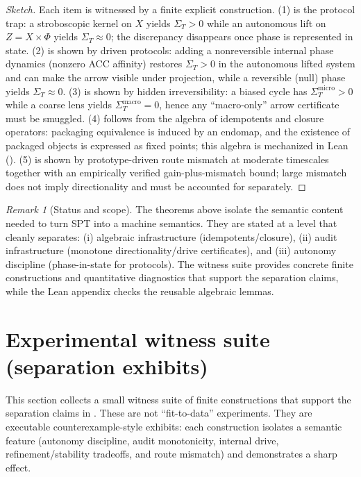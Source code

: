 \documentclass[11pt]{article}
\theoremstyle{definition}
\theoremstyle{remark}
\newtheorem{remark}[theorem]{Remark}
\begin{document}
\begin{proof}[Sketch]
Each item is witnessed by a finite explicit construction.
(1) is the protocol trap: a stroboscopic kernel on $X$ yields $\Sigma_T>0$ while an autonomous lift on $Z=X\times\Phi$ yields $\Sigma_T\approx 0$; the discrepancy disappears once phase is represented in state.
(2) is shown by driven protocols: adding a nonreversible internal phase dynamics (nonzero ACC affinity) restores $\Sigma_T>0$ in the autonomous lifted system and can make the arrow visible under projection, while a reversible (null) phase yields $\Sigma_T\approx 0$.
(3) is shown by hidden irreversibility: a biased cycle has $\Sigma_T^{\mathrm{micro}}>0$ while a coarse lens yields $\Sigma_T^{\mathrm{macro}}=0$, hence any ``macro-only'' arrow certificate must be smuggled.
(4) follows from the algebra of idempotents and closure operators: packaging equivalence is induced by an endomap, and the existence of packaged objects is expressed as fixed points; this algebra is mechanized in Lean ().
(5) is shown by prototype-driven route mismatch at moderate timescales together with an empirically verified gain-plus-mismatch bound; large mismatch does not imply directionality and must be accounted for separately.
\end{proof}

\begin{remark}[Status and scope]
The theorems above isolate the semantic content needed to turn SPT into a machine semantics.
They are stated at a level that cleanly separates: (i) algebraic infrastructure (idempotents/closure), (ii) audit infrastructure (monotone directionality/drive certificates), and (iii) autonomy discipline (phase-in-state for protocols).
The witness suite provides concrete finite constructions and quantitative diagnostics that support the separation claims, while the Lean appendix checks the reusable algebraic lemmas.
\end{remark}
 \section{Experimental witness suite (separation exhibits)}
\label{sec:experiments}

This section collects a small witness suite of finite constructions that support the separation claims in .
These are not ``fit-to-data'' experiments.
They are executable counterexample-style exhibits: each construction isolates a semantic feature (autonomy discipline, audit monotonicity, internal drive, refinement/stability tradeoffs, and route mismatch) and demonstrates a sharp effect.
\end{document}
